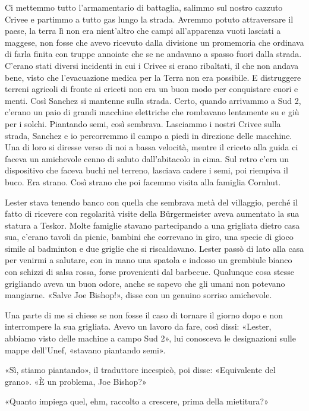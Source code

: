 Ci mettemmo tutto l'armamentario di battaglia, salimmo sul nostro
cazzuto Crivee e partimmo a tutto gas lungo la strada. Avremmo potuto
attraversare il paese, la terra lì non era nient'altro che campi
all'apparenza vuoti lasciati a maggese, non fosse che avevo ricevuto
dalla divisione un promemoria che ordinava di farla finita con truppe
annoiate che se ne andavano a spasso fuori dalla strada. C'erano stati
diversi incidenti in cui i Crivee si erano ribaltati, il che non andava
bene, visto che l'evacuazione medica per la Terra non era possibile. E
distruggere terreni agricoli di fronte ai criceti non era un buon modo
per conquistare cuori e menti. Così Sanchez si mantenne sulla strada.
Certo, quando arrivammo a Sud 2, c'erano un paio di grandi macchine
elettriche che rombavano lentamente su e giù per i solchi. Piantando
semi, così sembrava. Lasciammo i nostri Crivee sulla strada, Sanchez e
io percorremmo il campo a piedi in direzione delle macchine. Una di loro
si diresse verso di noi a bassa velocità, mentre il criceto alla guida
ci faceva un amichevole cenno di saluto dall'abitacolo in cima. Sul
retro c'era un dispositivo che faceva buchi nel terreno, lasciava cadere
i semi, poi riempiva il buco. Era strano. Così strano che poi facemmo
visita alla famiglia Cornhut.

Lester stava tenendo banco con quella che sembrava metà del villaggio,
perché il fatto di ricevere con regolarità visite della Bürgermeister
aveva aumentato la sua statura a Teskor. Molte famiglie stavano
partecipando a una grigliata dietro casa sua, c'erano tavoli da picnic,
bambini che correvano in giro, una specie di gioco simile al badminton e
due griglie che si riscaldavano. Lester passò di lato alla casa per
venirmi a salutare, con in mano una spatola e indosso un grembiule
bianco con schizzi di salsa rossa, forse provenienti dal barbecue.
Qualunque cosa stesse grigliando aveva un buon odore, anche se sapevo
che gli umani non potevano mangiarne. «Salve Joe Bishop!», disse con un
genuino sorriso amichevole.

Una parte di me si chiese se non fosse il caso di tornare il giorno dopo
e non interrompere la sua grigliata. Avevo un lavoro da fare, così
dissi: «Lester, abbiamo visto delle machine a campo Sud 2», lui
conosceva le designazioni sulle mappe dell'Unef, «stavano piantando
semi».

«Sì, stiamo piantando», il traduttore incespicò, poi disse: «Equivalente
del grano». «È un problema, Joe Bishop?»

«Quanto impiega quel, ehm, raccolto a crescere, prima della mietitura?»

